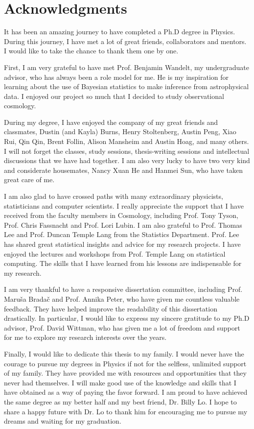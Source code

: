 \section*{Acknowledgments} 

It has been an amazing journey to have completed a Ph.D degree in Physics. 
During this journey, I have met a lot of great friends, collaborators and
mentors. I would like to take the chance to thank them one by one.  

First, I am very grateful to have met Prof. Benjamin Wandelt,  
my undergraduate advisor, who has always been a role model for me. 
He is my inspiration for learning about the use of Bayesian statistics 
to make inference from astrophysical data. I enjoyed our project so much that I   
decided to study observational cosmology.  

During my degree, I have enjoyed the company of my great friends and classmates, Dustin (and Kayla) 
Burns, Henry Stoltenberg, Austin Peng, Xiao Rui, Qin Qin, 
Brent Follin, Alison Mansheim and 
Austin Hoag, and many others. I will not forget the
classes, study sessions, thesis-writing sessions and 
intellectual discussions that we have had together.
I am also very lucky to have two very kind and considerate housemates, Nancy Xuan He
and Hanmei Sun, who have taken great care of me.  
 
I am also glad to have crossed paths with many 
extraordinary physicists, statisticians and computer scientists. 
I really appreciate the support that I have received from the
faculty members in Cosmology, including Prof. Tony Tyson, 
Prof. Chris Fassnacht and Prof. Lori Lubin. 
I am also grateful to Prof. Thomas Lee and Prof. Duncan Temple Lang from the
Statistics Department. Prof. Lee has shared great statistical insights and 
advice for my research projects. I have enjoyed the lectures and workshops 
from Prof. Temple Lang on statistical computing. The skills that I have learned
from his lessons are indispensable for my research. 
 
I am very thankful to have a responsive dissertation committee, including
Prof. Maru\v{s}a Brada\v{c} and Prof. Annika Peter, who have given me 
countless valuable feedback. They have helped improve the
readability of this dissertation drastically.  
In particular, I would like to express my sincere gratitude to my Ph.D advisor,
Prof. David Wittman, who has given me a lot of freedom and support for 
me to explore my research interests over the years. 

Finally, I would like to dedicate this thesis to my family.
I would never have the courage to pursue my degrees in Physics if not for the
selfless, unlimited support of my family.  
They have provided me with resources and opportunities that they never had
themselves. 
I will make good use of the knowledge and skills that I have obtained as a way
of paying the favor forward. I am proud to have achieved the same degree as my 
better half and my best friend, Dr. Billy Lo. I hope to share a happy future
with Dr. Lo to thank him for encouraging me to pursue my dreams and waiting for
my graduation. 
